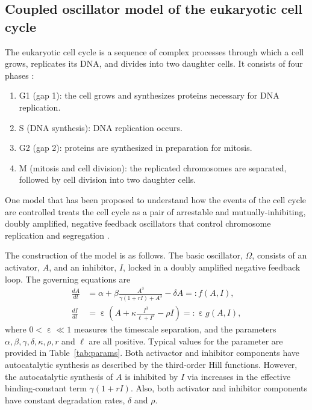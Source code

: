 \documentclass[10pt,onecolumn]{article}
\theoremstyle{plain}
\DeclareMathOperator{\eps}{\varepsilon}
\begin{document}
\subsection{Coupled oscillator model of the eukaryotic cell cycle} \label{subsec:modelconstruction}
The eukaryotic cell cycle is a sequence of complex processes through which a cell grows, replicates its DNA, and divides into two daughter cells. 
It consists of four phases \cite{Cooper2000,Morgan2007}: 
\begin{enumerate}[label=(\roman*)]
\setlength{\itemsep}{0pt}
\item G1 (gap 1): the cell grows and synthesizes proteins necessary for DNA replication. 
\item S (DNA synthesis): DNA replication occurs.
\item G2 (gap 2): proteins are synthesized in preparation for mitosis. 
\item M (mitosis and cell division): the replicated chromosomes are separated, followed by cell division into two daughter cells.
\end{enumerate}
%
One model that has been proposed to understand how the events of the cell cycle are controlled treats the cell cycle as a pair of arrestable and mutually-inhibiting, doubly amplified, negative feedback oscillators that control chromosome replication and segregation \cite{Dragoi2024}.

The construction of the model is as follows.
The basic oscillator, $\Omega$, consists of an activator, $A$, and an inhibitor, $I$, locked in a doubly amplified negative feedback loop. 
The governing equations are 
%
\begin{equation} \label{eq:single}
  \begin{split}
    \frac{dA}{dt} &= \alpha + \beta \frac{A^3}{\gamma(1+r I)+A^3}-\delta A =: f(A,I), \\ 
    \frac{dI}{dt} &= \eps \left( A + \kappa \frac{I^3}{\ell+I^3} - \rho I \right) =: \eps g(A,I), 
  \end{split}
\end{equation}
%
where $0< \eps \ll 1$ measures the timescale separation, and the parameters $\alpha, \beta, \gamma, \delta, \kappa, \rho, r$ and $\ell$ are all positive. Typical values for the parameter are provided in Table~\ref{tab:params}. 
Both activactor and inhibitor components have autocatalytic synthesis as described by the third-order Hill functions. However, the autocatalytic synthesis of $A$ is inhibited by $I$ via increases in the effective binding-constant term $\gamma(1+r I)$. Also, both activator and inhibitor components have constant degradation rates, $\delta$ and $\rho$. 
\end{document}
